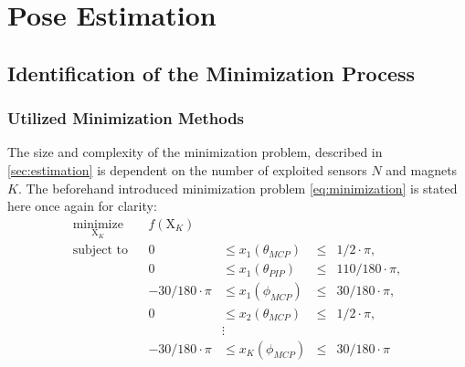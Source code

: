 \section{Pose Estimation} \label{sec:estimationRes}

\subsection{Identification of the Minimization Process} \label{subsec:resSim}

\subsubsection{Utilized Minimization Methods} \label{subsubsec:miniMethod}

The size and complexity of the minimization problem, described in \ref{sec:estimation} is dependent on the number of exploited sensors $ N $ and magnets $ K $. The beforehand introduced minimization problem \ref{eq:minimization} is stated here once again for clarity:
\begin{equation*} \label{eq:minimization}
\begin{aligned}
\underset{\mathrm{X}_K}{\text{minimize}} & & f(\mathrm{X}_K) \\
\text{subject to} & & 0 & \leq {x}_1(\theta_{MCP}) & \leq & 1/2 \cdot \pi, \\
				  & & 0 & \leq {x}_1(\theta_{PIP}) & \leq & 110/180 \cdot \pi, \\
				  & & -30/180 \cdot \pi & \leq {x}_1(\phi_{MCP}) & \leq & 30/180 \cdot \pi, \\
				  & & 0 & \leq {x}_2(\theta_{MCP}) & \leq & 1/2 \cdot \pi, \\
				  & & & \vdots \\
				  & & -30/180 \cdot \pi & \leq {x}_K(\phi_{MCP}) & \leq & 30/180 \cdot \pi
\end{aligned}
\end{equation*}
